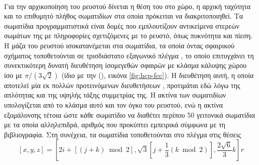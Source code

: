 \paragraph{} Για την αρχικοποίηση του ρευστού δίνεται η θέση του στο χώρο, η αρχική
ταχύτητα και το επιθυμητό πλήθος σωματιδίων στα οποία πρόκειται να διακριτοποιηθεί. Τα
σωματίδια προγραμματιστικά είναι δομές  που εμπλουτίζουν αντικείμενα στερεών
σωμάτων  της  με πληροφορίες σχετιζόμενες με το ρευστό, όπως
πυκνότητα και πίεση. Η μάζα του ρευστού ισοκατανέμεται στα σωματίδια, τα οποία όντας
σφαιρικού σχήματος τοποθετούνται σε τρισδιάστατο εξαγωνικό πλέγμα , το οποίο επιτυγχάνει τη συνεκτικότερη δυνατή διευθέτηση ίσομεγεθών
σφαιρών με κλάσμα κάλυψης χώρου ίσο με $\pi/(3\sqrt{2})$ (ίδιο με την 
(), εικόνα \ref{fig:hcp-fcc}). Η διευθέτηση αυτή, η οποία
αποτελεί μία εκ πολλών προτεινόμενων διευθετήσεων \cite{diehl2012generating,
  colagrossi2012particle}, προτιμάται εδώ λόγω της απλότητας και της υψηλής τάξης
συμμετρίας της. Η ακτίνα των σωματιδίων υπολογίζεται από το κλάσμα αυτό και τον όγκο του
ρευστού, ενώ η ακτίνα εξομάλυνσης  τέτοια ώστε κάθε σωματίδιο να διαθέτει περίπου
50 γειτονικά σωματίδια με τα οποία αλληλεπιδρά, αριθμός που προκύπτει εμπειρικά σύμφωνα με
τη βιβλιογραφία. Στη συνέχεια, τα σωματίδια τοποθετούνται στο πλέγμα στις θέσεις
\[
  [x, y, z] = \left[ 2i+[(j+k) \bmod 2], \sqrt{3}[j + \frac{1}{3} (k \bmod 2)],
    \frac{2\sqrt{6}}{3} k \right] r
\]

